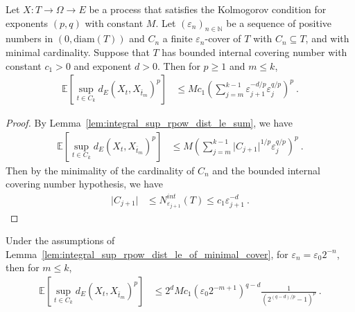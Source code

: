 \begin{lemma}\label{lem:integral_sup_rpow_dist_le_of_minimal_cover}
  \leanok
Let $X : T \to \Omega \to E$ be a process that satisfies the Kolmogorov condition for exponents $(p,q)$ with constant $M$.
Let $(\varepsilon_n)_{n \in \mathbb{N}}$ be a sequence of positive numbers in $(0, \mathrm{diam}(T))$ and $C_n$ a finite $\varepsilon_n$-cover of $T$ with $C_n \subseteq T$, and with minimal cardinality.
Suppose that $T$ has bounded internal covering number with constant $c_1>0$ and exponent $d > 0$.
Then for $p \ge 1$ and $m \le k$,
\begin{align*}
  \mathbb{E} \left[\sup_{t \in C_k} d_E(X_t, X_{\bar{t}_m})^p \right]
  &\le M c_1 \left( \sum_{j=m}^{k-1} \varepsilon_{j+1}^{-d/p} \varepsilon_j^{q/p} \right)^p
  \: .
\end{align*}
\end{lemma}

\begin{proof}\leanok
By Lemma~\ref{lem:integral_sup_rpow_dist_le_sum}, we have
\begin{align*}
  \mathbb{E} \left[\sup_{t \in C_k} d_E(X_t, X_{\bar{t}_m})^p \right]
  &\le M \left( \sum_{j=m}^{k-1} \vert C_{j+1} \vert^{1/p} \varepsilon_j^{q/p} \right)^p
  \: .
\end{align*}
Then by the minimality of the cardinality of $C_n$ and the bounded internal covering number hypothesis, we have
\begin{align*}
  \vert C_{j+1} \vert
  &\le N^{int}_{\varepsilon_{j+1}}(T)
  \le c_1 \varepsilon_{j+1}^{-d}
  \: .
\end{align*}
\end{proof}


\begin{corollary}\label{cor:integral_sup_rpow_dist_le_of_minimal_cover_two}
  \leanok
Under the assumptions of Lemma~\ref{lem:integral_sup_rpow_dist_le_of_minimal_cover}, for $\varepsilon_n = \varepsilon_0 2^{-n}$, then for $m \le k$,
\begin{align*}
  \mathbb{E} \left[\sup_{t \in C_k} d_E(X_t, X_{\bar{t}_m})^p \right]
  &\le 2^d M c_1 (\varepsilon_0 2^{-m + 1})^{q - d} \frac{1}{\left( 2^{(q -d)/p} - 1\right)^p}
  \: .
\end{align*}
\end{corollary}

